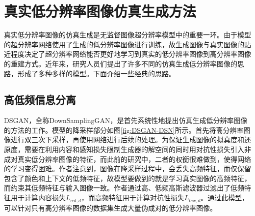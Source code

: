 \begin{figure}[htbp]
    \centering
    \hfill
\end{figure} 


\section{真实低分辨率图像仿真生成方法}

真实低分辨率图像的仿真生成是无监督图像超分辨率模型中的重要一环。由于模型的超分辨率网络使用了生成的低分辨率图像进行训练，故生成图像与真实图像的贴近程度决定了超分辨率网络能否更好地学习到真实的低分辨率图像到高分辨率图像的重建方式。近年来，研究人员们提出了许多不同的仿真生成低分辨率图像的思路，形成了多种多样的模型。下面介绍一些经典的思路。

\subsection{高低频信息分离}
DSGAN\cite{fritsche2019frequency}，全称DownSamplingGAN，是首先系统性地提出仿真生成低分辨率图像的方法的工作。模型的降采样部分如图\ref{fig:DSGAN-DSN}所示。首先将高分辨率图像进行双三次下采样，再使用网络进行后续的处理。为保证生成图像的拟真度和还原度，需要在利用内容和感知损失限制生成器的解空间的同时用对抗性损失引入非成对真实低分辨率图像的特征，而此前的研究中，二者的权衡很难做到，使得网络的学习变得困难。作者注意到，图像在降采样过程中，会丢失高频特征，而仅保留包含了颜色和上下文的低频特征，故模型要做到的就是学习真实图像的高频特征，而约束其低频特征与输入图像一致。作者通过高、低频高斯滤波器过滤出了低频特征用于计算内容损失$L_{col,d}$，而高频特征用于计算对抗性损失$L_{tex,d}$。通过此模型，可以针对只有高分辨率图像的数据集生成大量伪成对的低分辨率图像。

